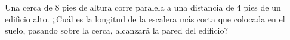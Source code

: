 \item Una cerca de 8 pies de altura corre paralela a una distancia de 4 pies de un edificio alto. ¿Cuál es la longitud de la escalera más corta que colocada en el suelo, pasando sobre la cerca, alcanzará la pared del edificio?
